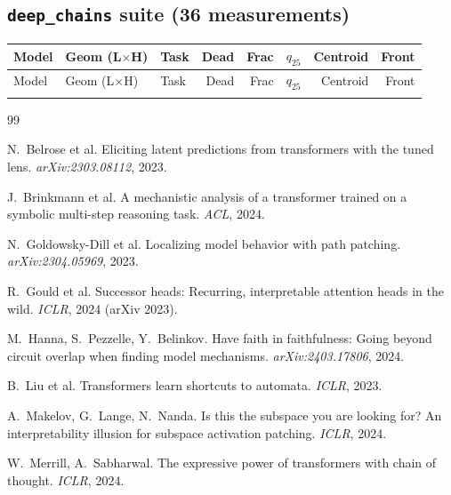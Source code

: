 \documentclass[11pt]{article}
\begin{document}
\subsection{\texttt{deep\_chains} suite (36 measurements)}
\small
\begin{longtable}{lllrrrrr}
\toprule
Model & Geom (L$\times$H) & Task & Dead & Frac & $q_{25}$ & Centroid & Front \\
\midrule
\endfirsthead
\toprule
Model & Geom (L$\times$H) & Task & Dead & Frac & $q_{25}$ & Centroid & Front \\
\midrule
\endhead
\bottomrule
\endfoot

\end{longtable}

\begin{thebibliography}{99}
\small

N.~Belrose et al.
\newblock Eliciting latent predictions from transformers with the tuned lens.
\newblock \emph{arXiv:2303.08112}, 2023.

J.~Brinkmann et al.
\newblock A mechanistic analysis of a transformer trained on a symbolic
multi-step reasoning task.
\newblock \emph{ACL}, 2024.

N.~Goldowsky-Dill et al.
\newblock Localizing model behavior with path patching.
\newblock \emph{arXiv:2304.05969}, 2023.

R.~Gould et al.
\newblock Successor heads: Recurring, interpretable attention heads in the wild.
\newblock \emph{ICLR}, 2024 (arXiv 2023).

M.~Hanna, S.~Pezzelle, Y.~Belinkov.
\newblock Have faith in faithfulness: Going beyond circuit overlap when finding
model mechanisms.
\newblock \emph{arXiv:2403.17806}, 2024.

B.~Liu et al.
\newblock Transformers learn shortcuts to automata.
\newblock \emph{ICLR}, 2023.

A.~Makelov, G.~Lange, N.~Nanda.
\newblock Is this the subspace you are looking for? An interpretability
illusion for subspace activation patching.
\newblock \emph{ICLR}, 2024.

W.~Merrill, A.~Sabharwal.
\newblock The expressive power of transformers with chain of thought.
\newblock \emph{ICLR}, 2024.


\end{thebibliography}
\end{document}
